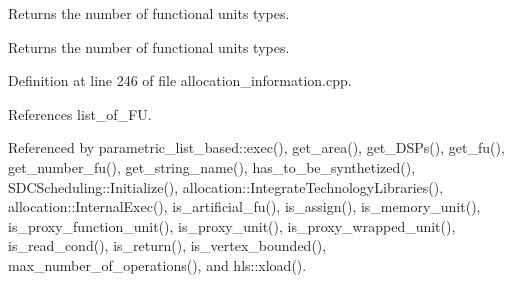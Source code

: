 Returns the number of functional units types. 

\begin{DoxyReturn}{Returns}
the number of functional units types. 
\end{DoxyReturn}


Definition at line 246 of file allocation\+\_\+information.\+cpp.



References list\+\_\+of\+\_\+\+FU.



Referenced by parametric\+\_\+list\+\_\+based\+::exec(), get\+\_\+area(), get\+\_\+\+D\+S\+Ps(), get\+\_\+fu(), get\+\_\+number\+\_\+fu(), get\+\_\+string\+\_\+name(), has\+\_\+to\+\_\+be\+\_\+synthetized(), S\+D\+C\+Scheduling\+::\+Initialize(), allocation\+::\+Integrate\+Technology\+Libraries(), allocation\+::\+Internal\+Exec(), is\+\_\+artificial\+\_\+fu(), is\+\_\+assign(), is\+\_\+memory\+\_\+unit(), is\+\_\+proxy\+\_\+function\+\_\+unit(), is\+\_\+proxy\+\_\+unit(), is\+\_\+proxy\+\_\+wrapped\+\_\+unit(), is\+\_\+read\+\_\+cond(), is\+\_\+return(), is\+\_\+vertex\+\_\+bounded(), max\+\_\+number\+\_\+of\+\_\+operations(), and hls\+::xload().

